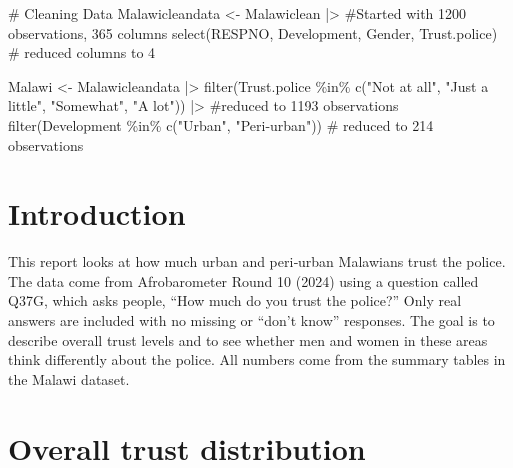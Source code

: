 \documentclass[
  letterpaper,
  DIV=11,
  numbers=noendperiod]{scrartcl}
\newenvironment{Shaded}{\begin{snugshade}}{\end{snugshade}}
\newcommand{\CommentTok}[1]{\textcolor[rgb]{0.37,0.37,0.37}{#1}}
\newcommand{\FunctionTok}[1]{\textcolor[rgb]{0.28,0.35,0.67}{#1}}
\newcommand{\NormalTok}[1]{\textcolor[rgb]{0.00,0.23,0.31}{#1}}
\newcommand{\OtherTok}[1]{\textcolor[rgb]{0.00,0.23,0.31}{#1}}
\newcommand{\SpecialCharTok}[1]{\textcolor[rgb]{0.37,0.37,0.37}{#1}}
\newcommand{\StringTok}[1]{\textcolor[rgb]{0.13,0.47,0.30}{#1}}
\begin{document}
\begin{Shaded}
\begin{Highlighting}[]
\CommentTok{\# Cleaning Data}
\NormalTok{Malawicleandata }\OtherTok{\textless{}{-}}\NormalTok{ Malawiclean }\SpecialCharTok{|\textgreater{}} \CommentTok{\#Started with 1200 observations, 365 columns}
  \FunctionTok{select}\NormalTok{(RESPNO, Development, Gender, Trust.police) }\CommentTok{\# reduced columns to 4}

\NormalTok{Malawi }\OtherTok{\textless{}{-}}\NormalTok{ Malawicleandata }\SpecialCharTok{|\textgreater{}}
  \FunctionTok{filter}\NormalTok{(Trust.police }\SpecialCharTok{\%in\%} \FunctionTok{c}\NormalTok{(}\StringTok{"Not at all"}\NormalTok{, }\StringTok{"Just a little"}\NormalTok{, }\StringTok{"Somewhat"}\NormalTok{, }\StringTok{"A lot"}\NormalTok{)) }\SpecialCharTok{|\textgreater{}} \CommentTok{\#reduced to 1193 observations}
\FunctionTok{filter}\NormalTok{(Development }\SpecialCharTok{\%in\%} \FunctionTok{c}\NormalTok{(}\StringTok{"Urban"}\NormalTok{, }\StringTok{"Peri{-}urban"}\NormalTok{)) }\CommentTok{\# reduced to 214 observations}
\end{Highlighting}
\end{Shaded}

\section{Introduction}\label{introduction}

This report looks at how much urban and peri‑urban Malawians trust the
police. The data come from Afrobarometer Round 10 (2024) using a
question called Q37G, which asks people, ``How much do you trust the
police?'' Only real answers are included with no missing or ``don't
know'' responses. The goal is to describe overall trust levels and to
see whether men and women in these areas think differently about the
police. All numbers come from the summary tables in the Malawi dataset.

\section{Overall trust distribution}\label{overall-trust-distribution}
\end{document}
